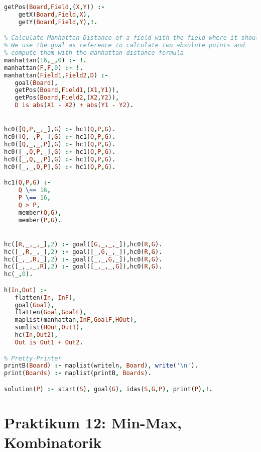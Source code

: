 \documentclass{scrreprt}
\begin{document}
\begin{anumerate}
\begin{lstlisting}[language=Prolog]
getPos(Board,Field,(X,Y)) :-
    getX(Board,Field,X),
    getY(Board,Field,Y),!.

% Calculate Manhattan-Distance of a field with the field where it should be
% We use the goal as reference to calculate two absolute points and
% compute them with the manhattan-distance formula
manhattan(16,_,0) :- !.
manhattan(F,F,0) :- !.
manhattan(Field1,Field2,D) :-
   goal(Board),
   getPos(Board,Field1,(X1,Y1)),
   getPos(Board,Field2,(X2,Y2)),
   D is abs(X1 - X2) + abs(Y1 - Y2).


hc0([Q,P,_,_],G) :- hc1(Q,P,G).
hc0([Q,_,P,_],G) :- hc1(Q,P,G).
hc0([Q,_,_,P],G) :- hc1(Q,P,G).
hc0([_,Q,P,_],G) :- hc1(Q,P,G).
hc0([_,Q,_,P],G) :- hc1(Q,P,G).
hc0([_,_,Q,P],G) :- hc1(Q,P,G).

hc1(Q,P,G) :-
    Q \== 16,
    P \== 16,
    Q > P,
    member(Q,G),
    member(P,G).


hc([R,_,_,_],2) :- goal([G,_,_,_]),hc0(R,G).
hc([_,R,_,_],2) :- goal([_,G,_,_]),hc0(R,G).
hc([_,_,R,_],2) :- goal([_,_,G,_]),hc0(R,G).
hc([_,_,_,R],2) :- goal([_,_,_,G]),hc0(R,G).
hc(_,0).

h(In,Out) :-
   flatten(In, InF),
   goal(Goal),
   flatten(Goal,GoalF),
   maplist(manhattan,InF,GoalF,HOut),
   sumlist(HOut,Out1),
   hc(In,Out2),
   Out is Out1 + Out2.

% Pretty-Printer
printB(Board) :- maplist(writeln, Board), write('\n').
print(Boards) :- maplist(printB, Boards).

solution(P) :- start(S), goal(G), idas(S,G,P), print(P),!.
\end{lstlisting}

\end{anumerate}

\chapter{Praktikum 12: Min-Max, Kombinatorik}
\end{document}
